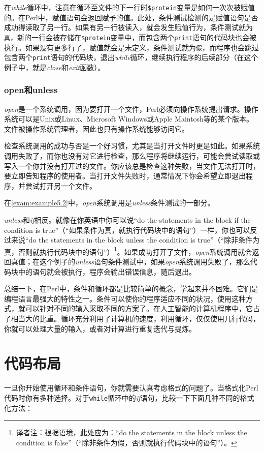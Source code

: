 在\textit{while}循环中，注意在循环至文件的下一行时\verb|$protein|变量是如何一次次被赋值的。在Perl中，赋值语句会返回赋予的值。此处，条件测试检测的是赋值语句是否成功得读取了另一行。如果有另一行被读入，就会发生赋值行为，条件测试就为\verb|真|，新的一行会被存储在\verb|$protein|变量中，而包含两个\verb|print|语句的代码块也会被执行。如果没有更多行了，赋值就会是未定义，条件测试就为\verb|假|，而程序也会跳过包含两个\verb|print|语句的代码块，退出\textit{while}循环，继续执行程序的后续部分（在这个例子中，就是\textit{close}和\textit{exit}函数）。

\subsubsection{open和unless}
\textit{open}是一个系统调用，因为要打开一个文件，Perl必须向操作系统提出请求。操作系统可以是Unix或Linux、Microsoft Windows或Apple Maintosh等的某个版本。文件被操作系统管理者，因此也只有操作系统能够访问它。

检查系统调用的成功与否是一个好习惯，尤其是当打开文件时更是如此。如果系统调用失败了，而你也没有对它进行检查，那么程序将继续运行，可能会尝试读取或写入一个你并没有打开过的文件。你应该总是检查这种失败，当文件无法打开时，要立即告知程序的使用者。当打开文件失败时，通常情况下你会希望立即退出程序，并尝试打开另一个文件。

在\autoref{exam:example5.2}中，\textit{open}系统调用是\textit{unless}条件测试的一部分。

\textit{unless}和\textit{if}相反。就像在你英语中你可以说“do the statements in the block if the condition is true”（“如果条件为真，就执行代码块中的语句”）一样，你也可以反过来说“do the statements in the block unless the condition is true”（“除非条件为真，否则就执行代码块中的语句”）\footnote{译者注：根据语境，此处应为：“do the statements in the block unless the condition is false”（“除非条件为假，否则就执行代码块中的语句”）。}。如果成功打开了文件，\textit{open}系统调用就会返回真值；在这个例子的\textit{unless}语句条件测试中，如果\textit{open}系统调用失败了，那么代码块中的语句就会被执行，程序会输出错误信息，随后退出。

总结一下，在Perl中，条件和循环都是比较简单的概念，学起来并不困难。它们是编程语言最强大的特性之一。条件可以使你的程序适应不同的状况，使用这种方式，就可以针对不同的输入采取不同的方案了。在人工智能的计算机程序中，它占了相当大的比重。循环充分利用了计算机的速度，利用循环，仅仅使用几行代码，你就可以处理大量的输入，或者对计算进行重复迭代与提炼。

\section{代码布局}
\label{sect:section5.2}
一旦你开始使用循环和条件语句，你就需要认真考虑格式的问题了。当格式化Perl代码时你有多种选择。对于\verb|while|循环中的\textit{if}语句，比较一下下面几种不同的格式化方法：

